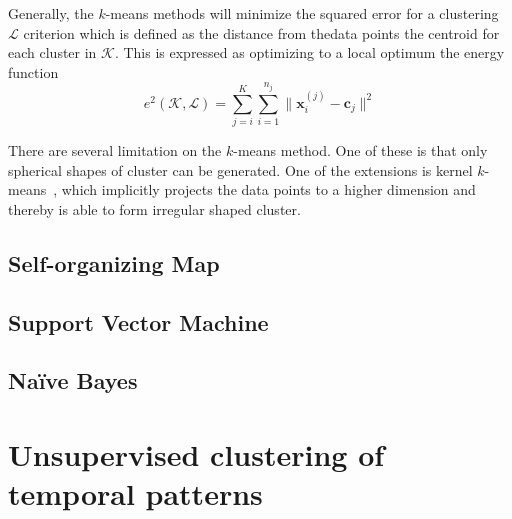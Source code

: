 Generally, the $k$-means methods will minimize the squared error for a clustering $\mathcal{L}$ criterion which is defined as the distance from thedata points the centroid for each cluster in $\mathcal{K}$.
This is expressed as optimizing to a local optimum the energy function
\begin{equation}
	\label{eq:k-means energy}
	e^2(\mathcal{K},\mathcal{L}) =
	\sum_{j=i}^{K}\sum_{i=1}^{n_j}\|\mathbf{x}_i^{(j)} -
	\mathbf{c}_j\|^2
\end{equation}

There are several limitation on the $k$-means method.
One of these is that only spherical shapes of cluster can be generated.
One of the extensions is kernel $k$-means~\cite{scholkopf1998nonlinear}, which implicitly projects the data points to a higher dimension and thereby is able to form irregular shaped cluster.

\subsection{Self-organizing Map}

\subsection{Support Vector Machine}

\subsection{Na\"{i}ve Bayes}

\section{Unsupervised clustering of temporal patterns}